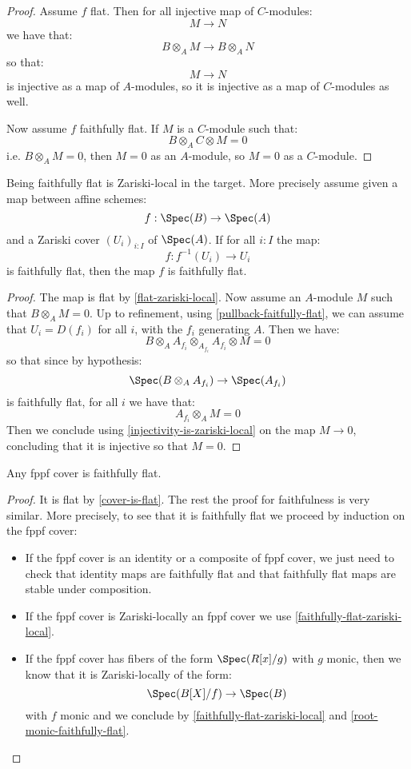\begin{proof}
Assume $f$ flat. Then for all injective map of $C$-modules:
\[M\to N\]
we have that:
\[B\otimes_A M \to B\otimes_A N\]
so that:
\[M\to N\]
is injective as a map of $A$-modules, so it is injective as a map of $C$-modules as well.

Now assume $f$ faithfully flat. If $M$ is a $C$-module such that:
\[B\otimes_A C\otimes M = 0\]
i.e. $B\otimes_A M = 0$, then $M=0$ as an $A$-module, so $M=0$ as a $C$-module.
\end{proof}

\begin{lemma}\label{faithfully-flat-zariski-local}
Being faithfully flat is Zariski-local in the target. More precisely assume given a map between affine schemes:
\[f:\Spec(B)\to \Spec(A)\]
and a Zariski cover $(U_i)_{i:I}$ of $\Spec(A)$. If for all $i:I$ the map:
\[f : f^{-1}(U_i)\to U_i\]
is faithfully flat, then the map $f$ is faithfully flat.
\end{lemma}

\begin{proof}
The map is flat by \cref{flat-zariski-local}. Now assume an $A$-module $M$ such that $B\otimes_AM=0$. Up to refinement, using \cref{pullback-faitfully-flat}, we can assume that $U_i = D(f_i)$ for all $i$, with the $f_i$ generating $A$. Then we have:
\[B\otimes_AA_{f_i}\otimes_{A_{f_i}}A_{f_i}\otimes M = 0\]
so that since by hypothesis:
\[\Spec(B\otimes_AA_{f_i}) \to \Spec(A_{f_i})\]
is faithfully flat, for all $i$ we have that:
\[A_{f_i}\otimes_A M = 0\]
Then we conclude using \cref{injectivity-is-zariski-local} on the map $M\to 0$, concluding that it is injective so that $M=0$.
\end{proof}

\begin{proposition}\label{cover-is-faithfully-flat}
Any fppf cover is faithfully flat.
\end{proposition}

\begin{proof}
It is flat by \cref{cover-is-flat}. The rest the proof for faithfulness is very similar. More precisely, to see that it is faithfully flat we proceed by induction on the fppf cover:
\begin{itemize}
\item If the fppf cover is an identity or a composite of fppf cover, we just need to check that identity maps are faithfully flat and that faithfully flat maps are stable under composition.
\item If the fppf cover is Zariski-locally an fppf cover we use \cref{faithfully-flat-zariski-local}.
\item If the fppf cover has fibers of the form $\Spec(R[x]/g)$ with $g$ monic, then we know that it is Zariski-locally of the form:
\[\Spec(B[X]/f)\to \Spec(B)\]
with $f$ monic and we conclude by \cref{faithfully-flat-zariski-local} and \cref{root-monic-faithfully-flat}.
\end{itemize}
\end{proof}

